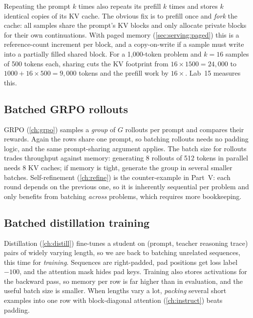 \begin{systemslens}
Repeating the prompt $k$ times also repeats its prefill $k$ times and stores $k$ identical copies of
its KV cache. The obvious fix is to prefill once and \emph{fork} the cache: all samples share the
prompt's KV blocks and only allocate private blocks for their own continuations. With paged memory
(\cref{sec:serving:paged}) this is a reference-count increment per block, and a copy-on-write if a
sample must write into a partially filled shared block. For a 1,000-token problem and $k=16$
samples of 500 tokens each, sharing cuts the KV footprint from $16\times1500=24{,}000$ to
$1000+16\times500=9{,}000$ tokens and the prefill work by $16\times$. Lab~15 measures this.
\end{systemslens}

\subsection{Batched GRPO rollouts}
GRPO (\cref{ch:grpo}) samples a \emph{group} of $G$ rollouts per prompt and compares their rewards.
Again the rows share one prompt, so batching rollouts needs no padding logic, and the same
prompt-sharing argument applies. The batch size for rollouts trades throughput against memory:
generating 8 rollouts of 512 tokens in parallel needs 8 KV caches; if memory is tight, generate the
group in several smaller batches. Self-refinement (\cref{ch:refine}) is the counter-example in Part~V:
each round depends on the previous one, so it is inherently sequential per problem and only benefits
from batching \emph{across} problems, which requires more bookkeeping.

\subsection{Batched distillation training}
Distillation (\cref{ch:distill}) fine-tunes a student on (prompt, teacher reasoning trace) pairs of
widely varying length, so we are back to batching unrelated sequences, this time for \emph{training}.
Sequences are right-padded, pad positions get loss label $-100$, and the attention mask hides pad keys.
Training also stores activations for the backward pass, so memory per row is far higher than in
evaluation, and the useful batch size is smaller. When lengths vary a lot, \emph{packing} several
short examples into one row with block-diagonal attention (\cref{ch:instruct}) beats padding.

